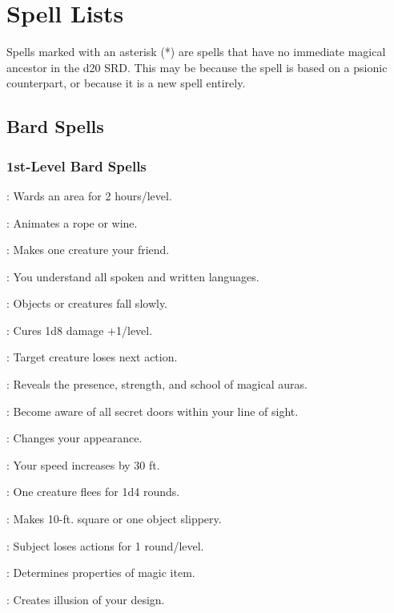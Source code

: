 \section{Spell Lists}
\label{sec:Spells}
Spells marked with an asterisk (*) are spells that have no immediate magical ancestor in the d20 SRD.
This may be because the spell is based on a psionic counterpart, or because it is a new spell entirely.
\subsection{Bard Spells}
\label{sec:BardSpells}
\subsubsection{1st-Level Bard Spells}
\begin{list}{}{\leftmargin=1em}
\item {}: Wards an area for 2 hours/level.
\item {}: Animates a rope or wine.
\item {}: Makes one creature your friend.
\item {}: You understand all spoken and written languages.
\item {}: Objects or creatures fall slowly.
\item {}: Cures 1d8 damage +1/level.
\item {}: Target creature loses next action.
\item {}: Reveals the presence, strength, and school of magical auras.
\item {}: Become aware of all secret doors within your line of sight.
\item {}: Changes your appearance.
\item {}: Your speed increases by 30 ft.
\item {}: One creature flees for 1d4 rounds.
\item {}: Makes 10-ft. square or one object slippery.
\item {}: Subject loses actions for 1 round/level.
\item {}: Determines properties of magic item.
\item {}: Creates illusion of your design.

\end{list}
